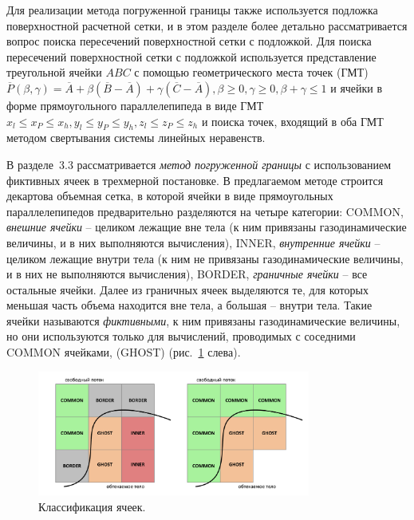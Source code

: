 \documentclass[a4paper,14pt]{extarticle}                     %
\theoremstyle{plain}                                         %
\begin{document}
Для реализации метода погруженной границы также используется подложка поверхностной расчетной сетки, и в этом разделе более детально рассматривается вопрос поиска пересечений поверхностной сетки с подложкой.
Для поиска пересечений поверхностной сетки с подложкой используется представление треугольной ячейки $ABC$ с помощью геометрического места точек (ГМТ) $\overline{P}(\beta, \gamma) = \overline{A} + \beta (\overline{B} - \overline{A}) + \gamma (\overline{C} - \overline{A}), \beta \ge 0, \gamma \ge 0, \beta + \gamma \le 1$ и ячейки в форме прямоугольного параллелепипеда в виде ГМТ $x_l \le x_P \le x_h, y_l \le y_P \le y_h, z_l \le z_P \le z_h$ и поиска точек, входящий в оба ГМТ методом свертывания системы линейных неравенств.


В разделе~3.3 рассматривается \textit{метод погруженной границы} с использованием фиктивных ячеек в трехмерной постановке.
В предлагаемом методе строится декартова объемная сетка, в которой ячейки в виде прямоугольных параллелепипедов предварительно разделяются на четыре категории:
COMMON, \textit{внешние ячейки} -- целиком лежащие вне тела (к ним привязаны газодинамические величины, и в них выполняются вычисления), INNER, \textit{внутренние ячейки} -- целиком лежащие внутри тела (к ним не привязаны газодинамические величины, и в них не выполняются вычисления), BORDER, \textit{граничные ячейки} -- все остальные ячейки.
Далее из граничных ячеек выделяются те, для которых меньшая часть объема находится вне тела, а большая -- внутри тела.
Такие ячейки называются \textit{фиктивными}, к ним привязаны газодинамические величины, но они используются только для вычислений, проводимых с соседними COMMON ячейками, (GHOST) (рис.~\ref{fig:text_1_immersed_boundary_method_class} слева).

\begin{figure}[ht]
\centering
\includegraphics[width=0.8\textwidth]{fig/int_cells_classification.pdf}
\singlespacing
\caption{Классификация ячеек.}
\label{fig:text_1_immersed_boundary_method_class}
\end{figure}
\end{document}
